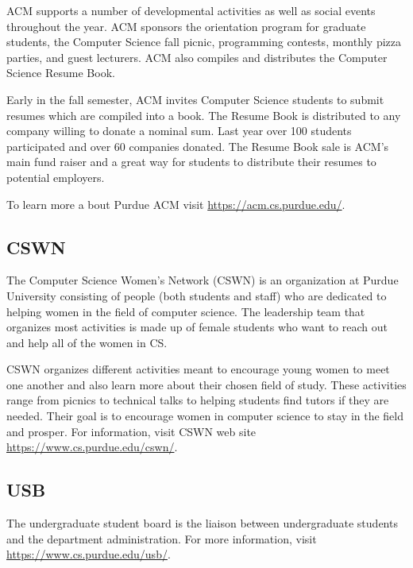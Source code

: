 ACM supports a number of developmental activities as well as social events throughout the year. ACM sponsors the orientation program for graduate students, the Computer Science fall picnic, programming contests, monthly pizza parties, and guest lecturers. ACM also compiles and distributes the Computer Science Resume Book.

Early in the fall semester, ACM invites Computer Science students to submit resumes which are compiled into a book. The Resume Book is distributed to any company willing to donate a nominal sum. Last year over 100 students participated and over 60 companies donated. The Resume Book sale is ACM's main fund raiser and a great way for students to distribute their resumes to potential employers.

To learn more a bout Purdue ACM visit \url{https://acm.cs.purdue.edu/}.



\subsection{CSWN}
The Computer Science Women's Network (CSWN) is an organization at Purdue University consisting of people (both students and staff) who are dedicated to helping women in the field of computer science. The leadership team that organizes most activities is made up of female students who want to reach out and help all of the women in CS.

CSWN organizes different activities meant to encourage young women to meet one another and also learn more about their chosen field of study. These activities range from picnics to technical talks to helping students find tutors if they are needed. Their goal is to encourage women in computer science to stay in the field and prosper. For information, visit CSWN web site \url{https://www.cs.purdue.edu/cswn/}.



\subsection{USB}
The undergraduate student board is the liaison between undergraduate students and the department administration. For more information, visit \url{https://www.cs.purdue.edu/usb/}.





